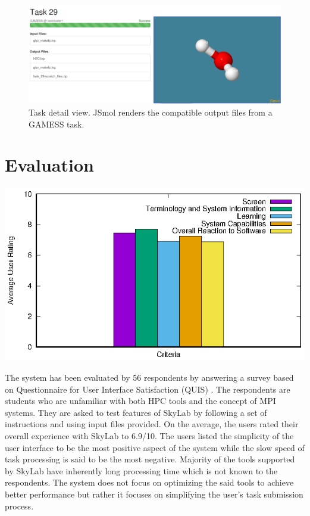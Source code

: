 \begin{figure}			
	\includegraphics[scale=0.35]{./images/jsmol_detail_view_2.png}			
	\caption{\label{fig:jsmol}Task detail view.  JSmol \cite{IJCH:IJCH201300024} renders the compatible output files from a GAMESS task.}			
\end{figure}	
	
	
\section{Evaluation}
	\begin{center}			
			\includegraphics{./images/rating.eps}			
	\end{center}
	The system has been evaluated by 56 respondents by answering a survey based on Questionnaire for User Interface Satisfaction (QUIS) \cite{chin1988development}. The respondents are students who are unfamiliar with both HPC tools and the concept of MPI systems.  They are asked to test features of SkyLab by following a set of instructions and using input files provided. On the average, the users rated their overall experience with SkyLab to 6.9/10. The users listed the simplicity of the user interface to be the most positive aspect of the system while the slow speed of task processing is said to be the most negative. Majority of the tools supported by SkyLab have inherently long processing time which is not known to the respondents. The system does not focus on optimizing the said tools to achieve better performance but rather it focuses on simplifying the user's task submission process. 

